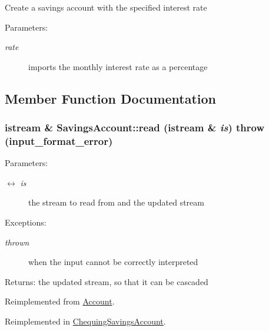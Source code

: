 Create a savings account with the specified interest rate

\begin{Desc}
\item[Parameters:]
\begin{description}
\item[{\em rate}]imports the monthly interest rate as a percentage \end{description}
\end{Desc}


\subsection{Member Function Documentation}
\hypertarget{classSavingsAccount_a738133ea37093f4e0ae9d3a6dc14674}{
\subsubsection[read]{\setlength{\rightskip}{0pt plus 5cm}istream \& SavingsAccount::read (istream \& {\em is})  throw (input\_\-format\_\-error)}}
\label{classSavingsAccount_a738133ea37093f4e0ae9d3a6dc14674}


\begin{Desc}
\item[Parameters:]
\begin{description}
\item[\mbox{$\leftrightarrow$} {\em is}]the stream to read from and the updated stream \end{description}
\end{Desc}
\begin{Desc}
\item[Exceptions:]
\begin{description}
\item[{\em thrown}]when the input cannot be correctly interpreted \end{description}
\end{Desc}
\begin{Desc}
\item[Returns:]the updated stream, so that it can be cascaded \end{Desc}


Reimplemented from \hyperlink{classAccount_1ef84736fe231b64547ba0b7824ac7c6}{Account}.

Reimplemented in \hyperlink{classChequingSavingsAccount_c0de0e2d3ac55227f31a4715ae257646}{ChequingSavingsAccount}.

